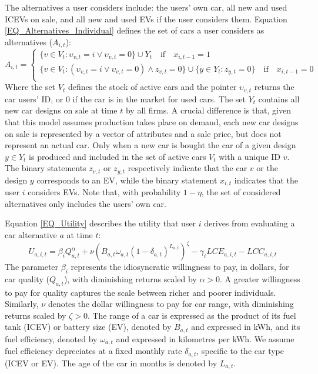 \documentclass[12pt]{article}
\begin{document}
	The alternatives a user considers include: the users' own car, all new and used ICEVs on sale, and all new and used EVs if the user considers them. Equation \ref{EQ_Alternatives_Individual} defines the set of cars a user considers as alternatives ($A_{i,t}$):
	\begin{equation}
		A_{i,t} = \begin{cases}
			\{v\in{V_t}:\upsilon_{v,t}=i\vee\upsilon_{v,t}=0\}\cup{Y_t}\quad\text{if}\quad{x_{i,t-1}=1}\\
			\{v\in{V_t}:(\upsilon_{v,t}=i\vee\upsilon_{v,t}=0)\wedge{z_{v,t}=0}\}\cup\{y\in{Y_{t}}:{z_{y,t}=0}\}\quad\text{if}\quad{x_{i,t-1}=0}\\
		\end{cases}
		\label{EQ_Alternatives_Individual}
	\end{equation}
	Where the set $V_t$ defines the stock of active cars and the pointer $\upsilon_{v,t}$ returns the car users' ID, or $0$ if the car is in the market for used cars. The set $Y_t$ contains all new car designs on sale at time $t$ by all firms. A crucial difference is that, given that this model assumes production takes place on demand, each new car designs on sale is represented by a vector of attributes and a sale price, but does not represent an actual car. Only when a new car is bought the car of a given design $y\in{Y_t}$ is produced and included in the set of active cars $V_t$ with a unique ID $v$.
	The binary statements $z_{v,t}$ or $z_{y,t}$ respectively indicate that the car $v$ or the design $y$ corresponds to an EV, while the binary statement $x_{i,t}$ indicates that the user $i$ considers EVs. Note that, with probability $1-\eta$, the set of considered alternatives only includes the users' own car.

Equation \ref{EQ_Utility} describes the utility that user $i$ derives from evaluating a car alternative $a$ at time $t$:
\begin{equation}
    U_{a,i,t} = \beta_i Q_{a,t}^\alpha + \nu (B_{a,t}\omega_{a,t}(1-\delta_{a,t})^{L_{a,t}})^{\zeta}
                - \gamma_i LCE_{a,i,t} - LCC_{a,i,t}
    \label{EQ_Utility}
\end{equation}
The parameter $\beta_i$ represents the idiosyncratic willingness to pay, in dollars, for car quality ($Q_{a,t}$), with diminishing returns scaled by $\alpha>0$. A greater willingness to pay for quality captures the scale between richer and poorer individuals. Similarly, $\nu$ denotes the dollar willingness to pay for car range, with diminishing returns scaled by $\zeta>0$. The range of a car is expressed as the product of its fuel tank (ICEV) or battery size (EV), denoted by $B_{a,t}$ and expressed in kWh, and its fuel efficiency, denoted by $\omega_{a,t}$ and expressed in kilometres per kWh. We assume fuel efficiency depreciates at a fixed monthly rate $\delta_{a,t}$, specific to the car type (ICEV or EV). The age of the car in months is denoted by $L_{a,t}$.
\end{document}
